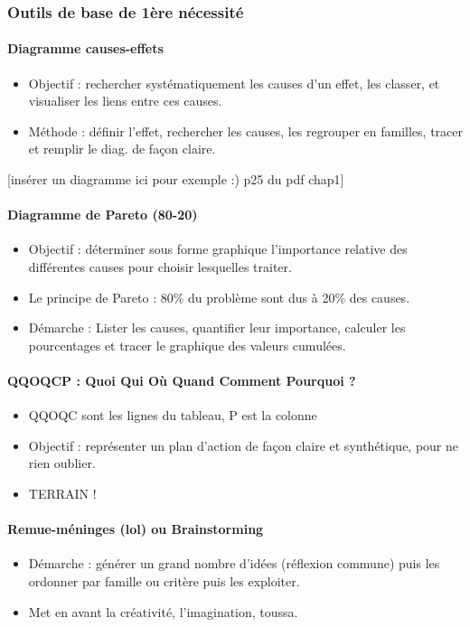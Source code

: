 			\subsubsection{Outils de base de 1ère nécessité}
				\paragraph{Diagramme causes-effets}
					\begin{itemize}
					\item Objectif : rechercher systématiquement les causes d'un effet, les classer, et visualiser les liens entre ces causes. 
					\item Méthode : définir l'effet, rechercher les causes, les regrouper en familles, tracer et remplir le diag. de façon claire. 
					\end{itemize}
					[insérer un diagramme ici pour exemple :) p25 du pdf chap1]
				\paragraph{Diagramme de Pareto (80-20)}
					\begin{itemize}
					\item Objectif : déterminer sous forme graphique l'importance relative des différentes causes pour choisir lesquelles traiter. 
					\item Le principe de Pareto : 80\% du problème sont dus à 20\% des causes. 
					\item Démarche : Lister les causes, quantifier leur importance, calculer les pourcentages et tracer le graphique des valeurs cumulées. 
					\end{itemize}
				\paragraph{QQOQCP : Quoi Qui Où Quand Comment Pourquoi ?}	
					\begin{itemize}
					\item QQOQC sont les lignes du tableau, P est la colonne
					\item Objectif : représenter un plan d'action de façon claire et synthétique, pour ne rien oublier. 
					\item TERRAIN ! 
					\end{itemize}
				\paragraph{Remue-méninges (lol) ou Brainstorming}
					\begin{itemize}
					\item Démarche : générer un grand nombre d'idées (réflexion commune) puis les ordonner par famille ou critère puis les exploiter. 
					\item Met en avant la créativité, l'imagination, toussa. 
					\end{itemize}

